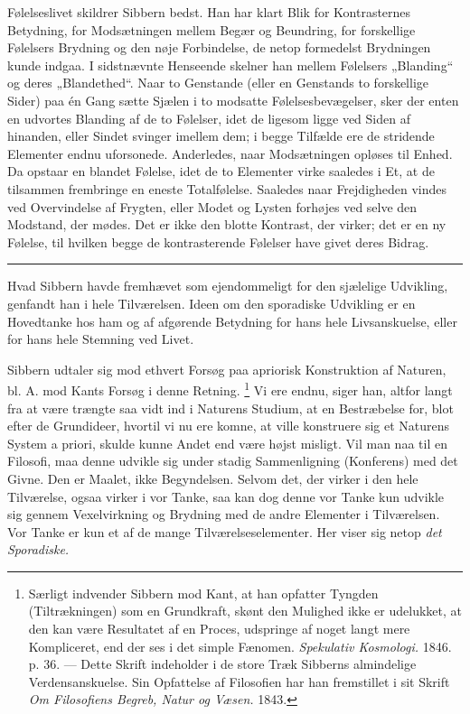 \documentclass[12pt,a4paper,openany]{book}
\newcommand{\opage}[1]{\marginnote{\footnotesize\textit{[#1]}}}
\begin{document}
Følelseslivet skildrer Sibbern bedst. Han har klart Blik for Kontrasternes
Betydning, for Modsætningen mellem Begær og Beundring, for forskellige
Følelsers Brydning og den nøje Forbindelse, de netop formedelst Brydningen
kunde indgaa. I sidstnævnte Henseende skelner han mellem Følelsers „Blanding“
og deres „Blandethed“. Naar to Genstande (eller en Genstands to forskellige
Sider) paa én Gang sætte Sjælen i to modsatte Følelsesbevægelser, sker der
enten en udvortes Blanding af de to Følelser, idet de ligesom ligge ved Siden
af hinanden, eller Sindet svinger imellem dem; i begge Tilfælde ere de
stridende Elementer endnu uforsonede. Anderledes, naar Modsætningen opløses til
Enhed. Da opstaar en blandet Følelse, idet de to Elementer virke saaledes i Et,
at de tilsammen frembringe en eneste Totalfølelse. Saaledes naar Frejdigheden
vindes ved Overvindelse af Frygten, eller Modet og Lysten forhøjes ved selve
den Modstand, der mødes. Det er ikke den blotte Kontrast, der virker; det er en
ny Følelse, til hvilken begge de kontrasterende Følelser have givet deres Bidrag.

\begin{center}\rule{2cm}{0.4pt}\end{center}

Hvad Sibbern havde fremhævet som ejendommeligt for den sjælelige Udvikling,
genfandt han i hele Tilværelsen. Ideen om den sporadiske Udvikling er en
Hovedtanke hos ham og af afgørende Betydning for hans hele Livsanskuelse, eller
for hans hele Stemning ved Livet.

\setcounter{footnote}{0}%
\opage{103}Sibbern udtaler sig mod ethvert Forsøg paa apriorisk Konstruktion af
Naturen, bl. A. mod Kants Forsøg i denne Retning.%
\footnote[1]{Særligt indvender Sibbern mod Kant, at han opfatter Tyngden
(Tiltrækningen) som en Grundkraft, skønt den Mulighed ikke er udelukket, at den
kan være Resultatet af en Proces, udspringe af noget langt mere Kompliceret,
end der ses i det simple Fænomen. \textit{Spekulativ Kosmologi.} 1846. p. 36.
--- Dette Skrift indeholder i de store Træk Sibberns almindelige
Verdensanskuelse. Sin Opfattelse af Filosofien har han fremstillet i sit Skrift
\textit{Om Filosofiens Begreb, Natur og Væsen.} 1843.} Vi ere endnu, siger han,
altfor langt fra at være trængte saa vidt ind i Naturens Studium, at en
Bestræbelse for, blot efter de Grundideer, hvortil vi nu ere komne, at ville
konstruere sig et Naturens System a priori, skulde kunne Andet end være højst
misligt. Vil man naa til en Filosofi, maa denne udvikle sig under stadig
Sammenligning (Konferens) med det Givne. Den er Maalet, ikke Begyndelsen.
Selvom det, der virker i den hele Tilværelse, ogsaa virker i vor Tanke, saa kan
dog denne vor Tanke kun udvikle sig gennem Vexelvirkning og Brydning med de
andre Elementer i Tilværelsen. Vor Tanke er kun et af de mange
Tilværelseselementer. Her viser sig netop \textit{det Sporadiske.}
\end{document}
